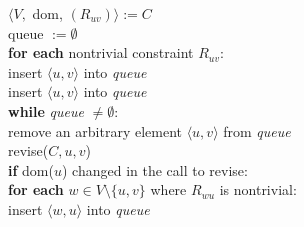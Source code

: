 \begin{tcolorbox}[title={\textbf{function} AC-3($C$):}]
	$\langle V,$ dom, $(R_{uv})\rangle := C$ \\
	queue $:= \emptyset$ \\
	\textbf{for each} nontrivial constraint $R_{uv}$: \\
	insert $\langle u, v \rangle$ into \textit{queue} \\
	insert $\langle u, v \rangle$ into \textit{queue} \\

	\textbf{while} \textit{queue} $\neq \emptyset$: \\
	remove an arbitrary element $\langle u, v \rangle$ from \textit{queue} \\
	revise($C, u, v$) \\
	\textbf{if} dom($u$) changed in the call to revise: \\
	\textbf{for each} $w \in V \setminus \{u,v\}$ where $R_{wu}$ is nontrivial: \\
	insert $\langle w, u \rangle$ into \textit{queue}
\end{tcolorbox}

